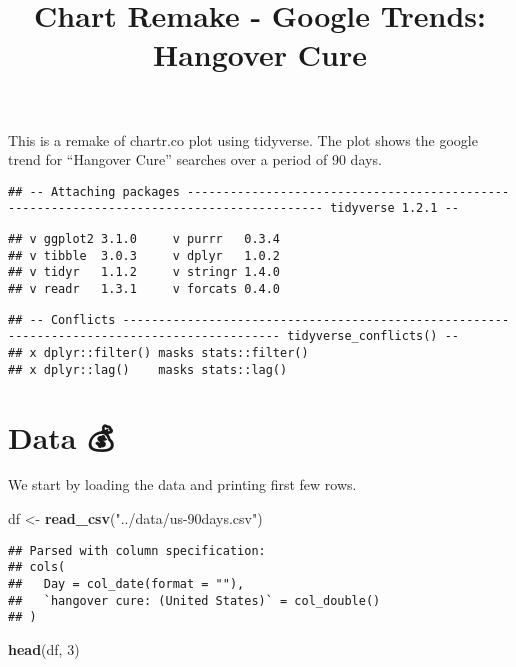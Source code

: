 \documentclass[]{article}
\title{Chart Remake - Google Trends: Hangover Cure}
\author{}
\date{}
\newenvironment{Shaded}{\begin{snugshade}}{\end{snugshade}}
\newcommand{\KeywordTok}[1]{\textcolor[rgb]{0.13,0.29,0.53}{\textbf{#1}}}
\newcommand{\DecValTok}[1]{\textcolor[rgb]{0.00,0.00,0.81}{#1}}
\newcommand{\StringTok}[1]{\textcolor[rgb]{0.31,0.60,0.02}{#1}}
\newcommand{\NormalTok}[1]{#1}
\begin{document}
\maketitle

This is a remake of chartr.co plot using tidyverse. The plot shows the
google trend for ``Hangover Cure'' searches over a period of 90 days.

\begin{verbatim}
## -- Attaching packages ----------------------------------------------------------------------------------------- tidyverse 1.2.1 --
\end{verbatim}

\begin{verbatim}
## v ggplot2 3.1.0     v purrr   0.3.4
## v tibble  3.0.3     v dplyr   1.0.2
## v tidyr   1.1.2     v stringr 1.4.0
## v readr   1.3.1     v forcats 0.4.0
\end{verbatim}

\begin{verbatim}
## -- Conflicts -------------------------------------------------------------------------------------------- tidyverse_conflicts() --
## x dplyr::filter() masks stats::filter()
## x dplyr::lag()    masks stats::lag()
\end{verbatim}

\section{Data 💰}\label{data}

We start by loading the data and printing first few rows.

\begin{Shaded}
\begin{Highlighting}[]
\NormalTok{df <-}\StringTok{ }\KeywordTok{read_csv}\NormalTok{(}\StringTok{"../data/us-90days.csv"}\NormalTok{)}
\end{Highlighting}
\end{Shaded}

\begin{verbatim}
## Parsed with column specification:
## cols(
##   Day = col_date(format = ""),
##   `hangover cure: (United States)` = col_double()
## )
\end{verbatim}

\begin{Shaded}
\begin{Highlighting}[]
\KeywordTok{head}\NormalTok{(df, }\DecValTok{3}\NormalTok{)}
\end{Highlighting}
\end{Shaded}
\end{document}
